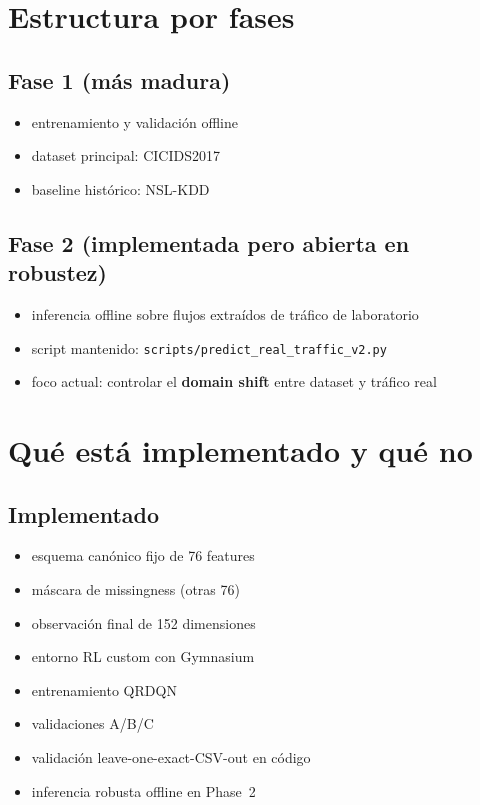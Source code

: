 ﻿\documentclass[12pt,a4paper]{article}
\begin{document}
\section{Estructura por fases}

\subsection{Fase 1 (más madura)}

\begin{itemize}
  \item entrenamiento y validación offline
  \item dataset principal: CICIDS2017
  \item baseline histórico: NSL-KDD
\end{itemize}

\subsection{Fase 2 (implementada pero abierta en robustez)}

\begin{itemize}
  \item inferencia offline sobre flujos extraídos de tráfico de laboratorio
  \item script mantenido: \verb|scripts/predict_real_traffic_v2.py|
  \item foco actual: controlar el \textbf{domain shift} entre dataset y tráfico real
\end{itemize}

\section{Qué está implementado y qué no}

\subsection{Implementado}

\begin{itemize}
  \item esquema canónico fijo de 76 features
  \item máscara de missingness (otras 76)
  \item observación final de 152 dimensiones
  \item entorno RL custom con Gymnasium
  \item entrenamiento QRDQN
  \item validaciones A/B/C
  \item validación leave-one-exact-CSV-out en código
  \item inferencia robusta offline en Phase~2
\end{itemize}
\end{document}
